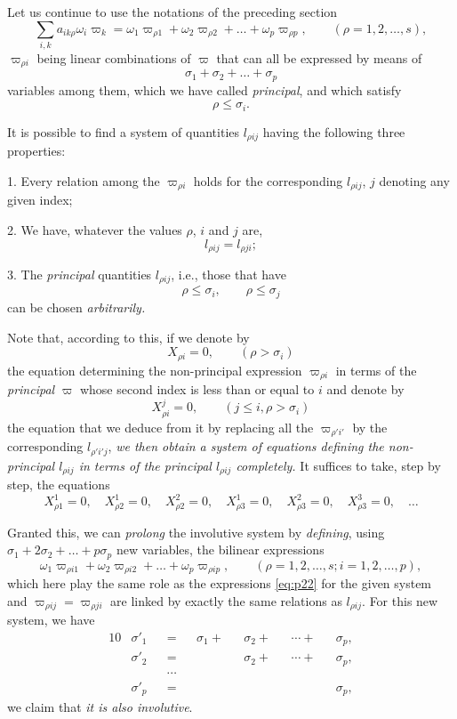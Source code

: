 \documentclass[leqno,11pt]{book}
\theoremstyle{shape1}
\theoremstyle{shapesmall}
\newcommand{\vp}{\varpi}
\begin{document}
Let us continue to use the notations of the preceding section
\begin{equation}
  \label{eq:p22}
  \sum_{i,k}a_{ik\rho}\omega_{i}\vp_{k}=\omega_{1}\vp_{\rho 1}+\omega_{2}\vp_{\rho 2}+\dots+\omega_{p}\vp_{\rho p},\qquad(\rho=1,2,\dots,s),
\end{equation}
$\vp_{\rho i}$ being linear combinations of $\vp$ that can all be expressed by means of
\[
\sigma_{1}+\sigma_{2}+\dots+\sigma_{p}
\]
variables among them, which we have called \emph{principal}, and which satisfy
\[
\rho\le \sigma_{i}.
\]

It is possible to find a system of quantities $l_{\rho ij}$ having the following three properties:

1. Every relation among the $\vp_{\rho i}$ holds for the corresponding $l_{\rho ij}$, $j$ denoting any given index;

2. We have, whatever the values $\rho$, $i$ and $j$ are,
\[
l_{\rho ij}=l_{\rho ji};
\]

3. The \emph{principal} quantities $l_{\rho ij}$, i.e., those that have
\[
\rho \le \sigma_{i},\qquad \rho\le \sigma_{j}
\]
can be chosen \emph{arbitrarily.}

Note that, according to this, if we denote by
\[
X_{\rho i}=0,\qquad(\rho >\sigma_{i})
\]
the equation determining the non-principal expression $\vp_{\rho i}$ in terms of the \emph{principal} $\vp$ whose second index is less than or equal to $i$ and denote by
\[
X^{j}_{\rho i}=0,\qquad(j\le i,\rho >\sigma_{i})
\]
the equation that we deduce from it by replacing all the $\vp_{\rho'i'}$ by the corresponding $l_{\rho'i'j}$, \emph{we then obtain a system of equations defining the non-principal $l_{\rho ij}$ in terms of the principal $l_{\rho ij}$ completely.} It suffices to take, step by step, the equations
\[
X^{1}_{\rho 1}=0,\quad
X^{1}_{\rho 2}=0,\quad
X^{2}_{\rho 2}=0,\quad
X^{1}_{\rho 3}=0,\quad
X^{2}_{\rho 3}=0,\quad
X^{3}_{\rho 3}=0,\quad
\dots
\]

Granted this, we can \emph{prolong} the involutive system by \emph{defining}, using $\sigma_{1}+2\sigma_{2}+\dots+p\sigma_{p}$ new variables, the bilinear expressions
\begin{equation}
  \label{eq:p23}
  \omega_{1}\vp_{\rho i1}+\omega_{2}\vp_{\rho i2}+\dots+\omega_{p}\vp_{\rho ip},\qquad(\rho =1,2,\dots,s;i=1,2,\dots,p),
\end{equation}
which here play the same role as the expressions \eqref{eq:p22} for the given system and $\vp_{\rho ij}=\vp_{\rho ji}$ are linked by exactly the same relations as $l_{\rho ij}$. For this new system, we have
\begin{alignat*}{10}
  &\sigma'_{1}&&{}={}&&\sigma_{1}{}+{}&&\sigma_{2}{}+{}&&\cdots{}+{}&&\sigma_{p},\\
  &\sigma'_{2}&&{}={}&&&&\sigma_{2}{}+{}&&\cdots{}+{}&&\sigma_{p},\\
  &&&\cdots\\
  &\sigma'_{p}&&{}={}&&&&&&&&\sigma_{p},
\end{alignat*}
we claim that \emph{it is also involutive}.
\end{document}
